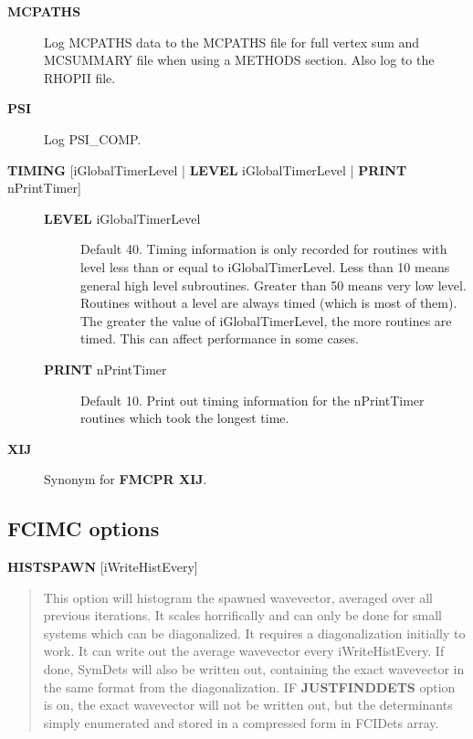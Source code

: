 \documentclass[openany,a4paper,10pt]{manual}
\begin{document}
\begin{description}
\item[\textbf{MCPATHS}]
Log MCPATHS data to the MCPATHS file for full vertex sum and MCSUMMARY
file when using a METHODS section.  Also log to the RHOPII file.

\item[\textbf{PSI}]
Log PSI\_COMP.

\item[\textbf{TIMING} {[}iGlobalTimerLevel | \textbf{LEVEL} iGlobalTimerLevel | \textbf{PRINT} nPrintTimer{]}]\begin{description}
\item[\textbf{LEVEL} iGlobalTimerLevel]
Default 40.
Timing information is only recorded for routines with level less than
or equal to iGlobalTimerLevel.  Less than 10 means general high level
subroutines. Greater than 50 means very low level.  Routines without
a level are always timed (which is most of them).  The greater the value
of iGlobalTimerLevel, the more routines are timed.  This can affect
performance in some cases.

\item[\textbf{PRINT} nPrintTimer]
Default 10.
Print out timing information for the nPrintTimer routines which took the longest time.

\end{description}

\item[\textbf{XIJ}]
Synonym for \textbf{FMCPR XIJ}.

\end{description}


\subsection{FCIMC options}

\textbf{HISTSPAWN} {[}iWriteHistEvery{]}
\begin{quote}

This option will histogram the spawned wavevector, averaged over all previous iterations.
It scales horrifically and can only be done for small systems which can be diagonalized.
It requires a diagonalization initially to work. It can write out the average wavevector every iWriteHistEvery.
If done, SymDets will also be written out, containing the exact wavevector in the same format from the
diagonalization.
IF \textbf{JUSTFINDDETS} option is on, the exact wavevector will not be written out, but the determinants simply
enumerated and stored in a compressed form in FCIDets array.
\end{quote}
\end{document}
